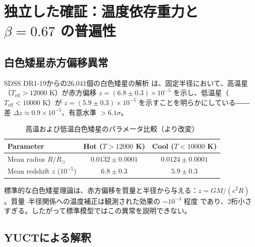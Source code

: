 \documentclass[11pt,a4paper]{article}
\theoremstyle{remark}
\begin{document}
	\section{独立した確証：温度依存重力と \(\beta = 0.67\) の普遍性}
	\label{sec:universal-proof}
	
	\subsection{白色矮星赤方偏移異常}
	\label{subsec:wd-anomaly}
	
	SDSS DR1-19からの26,041個の白色矮星の解析 \cite{Crumpler2024} は、固定半径において、高温星（\(T_{\mathrm{eff}} > 12000\) K）が赤方偏移 \(z = (6.8 \pm 0.3) \times 10^{-5}\) を示し、低温星（\(T_{\mathrm{eff}} < 10000\) K）が \(z = (5.9 \pm 0.3) \times 10^{-5}\) を示すことを明らかにしている――差 \(\Delta z \approx 0.9 \times 10^{-5}\)、有意水準 \(>6.1\sigma\)。
	
	\begin{table}[H]
		\begin{otherlanguage}{english}
			\centering
			\caption{Comparison of hot and cool white dwarf parameters (adapted from \cite{Crumpler2024})}
			\label{tab:wd-results}
			\begin{tabular}{lcc}
				\toprule
				\textbf{Parameter} & \textbf{Hot (\(T>12000\) K)} & \textbf{Cool (\(T<10000\) K)} \\
				\midrule
				Mean radius \(R/R_\odot\) & \(0.0132 \pm 0.0001\) & \(0.0124 \pm 0.0001\) \\
				Mean redshift \(z\) (\(10^{-5}\)) & \(6.8 \pm 0.3\) & \(5.9 \pm 0.3\) \\
				\bottomrule
			\end{tabular}
		\end{otherlanguage}
		\caption{高温および低温白色矮星のパラメータ比較（\cite{Crumpler2024}より改変）}
	\end{table}
	
	標準的な白色矮星理論は、赤方偏移を質量と半径から与える：\(z = GM/(c^2 R)\)。質量–半径関係への温度補正は観測された効果の \(\sim 10^{-4}\) 程度 \cite{Fontaine2001} であり、2桁小さすぎる。したがって標準模型ではこの異常を説明できない。
	
	\subsection{YUCTによる解釈}
	\label{subsec:wd-yuct-interp}
	
\end{document}
